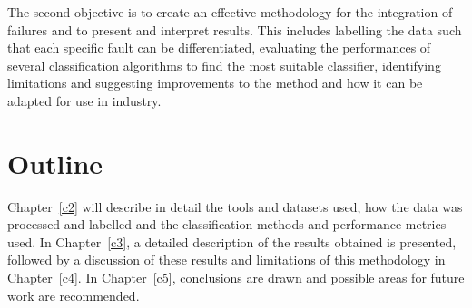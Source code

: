 The second objective is to create an effective methodology for the integration of failures and to present and interpret results. This includes labelling the data such that each specific fault can be differentiated, evaluating the performances of several classification algorithms to find the most suitable classifier, identifying limitations and suggesting improvements to the method and how it can be adapted for use in industry.

\section{Outline}

Chapter~\ref{c2} will describe in detail the tools and datasets used, how the data was processed and labelled and the classification methods and performance metrics used. In Chapter~\ref{c3}, a detailed description of the results obtained is presented, followed by a discussion of these results and limitations of this methodology in Chapter~\ref{c4}. In Chapter~\ref{c5}, conclusions are drawn and possible areas for future work are recommended.
